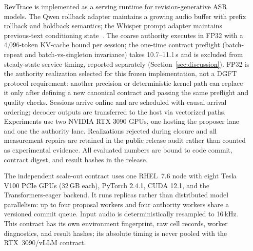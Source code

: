 
RevTrace is implemented as a serving runtime for revision-generative ASR
models. The Qwen rollback adapter maintains a growing audio buffer with
prefix rollback and holdback semantics; the Whisper prompt adapter maintains
previous-text conditioning state~\cite{shi2026qwen3asr,radford2023whisper}.
The coarse authority executes in FP32 with a 4{,}096-token KV-cache bound
per session; the one-time contract preflight (batch-repeat and
batch-vs-singleton invariance) takes 10.7--11.1\,s and is excluded from
steady-state service timing, reported separately
(Section~\ref{sec:discussion}). FP32 is the authority realization selected
for this frozen implementation, not a DGFT protocol requirement: another
precision or deterministic kernel path can replace it only after defining a
new canonical contract and passing the same preflight and quality checks.
Sessions arrive online and are scheduled
with causal arrival ordering; decoder outputs are transferred to the host
via vectorized paths. Experiments use two NVIDIA RTX 3090 GPUs, one
hosting the proposer lane and one the authority lane. Realizations rejected
during closure and all measurement repairs are retained in the public release
audit rather than counted as experimental evidence. All evaluated numbers are
bound to code commit, contract digest, and result hashes in the release.
\artifactavailability

The independent scale-out contract uses one RHEL~7.6 node with eight
Tesla V100 PCIe GPUs (32\,GB each), PyTorch 2.4.1, CUDA 12.1, and the
Transformers-eager backend. It runs replicas rather than distributed model
parallelism: up to four proposal workers and four authority workers share a
versioned commit queue. Input audio is deterministically resampled to 16\,kHz.
This contract has its own environment fingerprint, raw cell records, worker
diagnostics, and result hashes; its absolute timing is never pooled with the
RTX~3090/vLLM contract.
